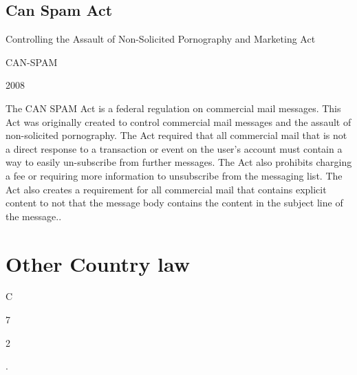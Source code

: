 \documentclass[14pt]{article}
\begin{document}
\subsection{Can Spam Act}
    \begin{description}[leftmargin=!, labelwidth=\widthof{\bfseries Year Approved}]
        \item [Name] Controlling the Assault of Non-Solicited Pornography and Marketing Act
        \item [Abbreviation] CAN-SPAM
        \item [Year Approved] 2008
        \item [Description] The CAN SPAM Act is a federal regulation on commercial mail messages. This Act was originally created to control commercial mail messages and the assault of non-solicited pornography. The Act required that all commercial mail that is not a direct response to a transaction or event on the user's account must contain a way to easily un-subscribe from further messages. The Act also prohibits charging a fee or requiring more information to unsubscribe from the messaging list. The Act also creates a requirement for all commercial mail that contains explicit content to not that the message body contains the content in the subject line of the message.\cite{CANSPAM}.
    \end{description}
    
\section{Other Country law}
    \begin{description}[leftmargin=!, labelwidth=\widthof{\bfseries Year Approved}]
        \item [Name] C
        \item [Abbreviation] 7
        \item [Year Approved] 2
        \item [Description] \cite{GDPR}.
    \end{description}

\newpage


\end{document}
